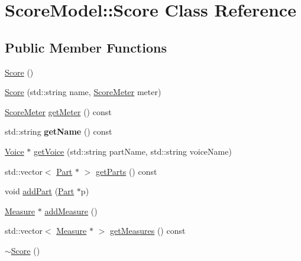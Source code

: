 \hypertarget{classScoreModel_1_1Score}{}\section{Score\+Model\+::Score Class Reference}
\label{classScoreModel_1_1Score}
\subsection*{Public Member Functions}
\begin{DoxyCompactItemize}
\item 
\mbox{\hyperlink{classScoreModel_1_1Score_acb19d6040f57ce1bf4e68dd8dab852cc}{Score}} ()
\item 
\mbox{\hyperlink{classScoreModel_1_1Score_a8721726afd70c41fdf9307a97ded2039}{Score}} (std\+::string name, \mbox{\hyperlink{classScoreModel_1_1ScoreMeter}{Score\+Meter}} meter)
\item 
\mbox{\hyperlink{classScoreModel_1_1ScoreMeter}{Score\+Meter}} \mbox{\hyperlink{classScoreModel_1_1Score_a593a14d9b5a926a4784c75c62780092b}{get\+Meter}} () const
\item 
\mbox{\label{classScoreModel_1_1Score_acb96344d926f124d945bece85de996ef}} 
std\+::string {\bfseries get\+Name} () const
\item 
\mbox{\hyperlink{classScoreModel_1_1Voice}{Voice}} $\ast$ \mbox{\hyperlink{classScoreModel_1_1Score_ac5c2af8ebfc77176d9f2c4306a4d04cb}{get\+Voice}} (std\+::string part\+Name, std\+::string voice\+Name)
\item 
std\+::vector$<$ \mbox{\hyperlink{classScoreModel_1_1Part}{Part}} $\ast$ $>$ \mbox{\hyperlink{classScoreModel_1_1Score_a1bbc42654c49e6ac2273d38cca19c5e6}{get\+Parts}} () const
\item 
void \mbox{\hyperlink{classScoreModel_1_1Score_a1e4114e834b8bea1198e36327472fd72}{add\+Part}} (\mbox{\hyperlink{classScoreModel_1_1Part}{Part}} $\ast$p)
\item 
\mbox{\hyperlink{classScoreModel_1_1Measure}{Measure}} $\ast$ \mbox{\hyperlink{classScoreModel_1_1Score_aa528b4e1ef3181f6f90c93b49fe8fafd}{add\+Measure}} ()
\item 
std\+::vector$<$ \mbox{\hyperlink{classScoreModel_1_1Measure}{Measure}} $\ast$ $>$ \mbox{\hyperlink{classScoreModel_1_1Score_ab57bcfbe1552fba4e8e7882a7db8b21b}{get\+Measures}} () const
\item 
\mbox{\hyperlink{classScoreModel_1_1Score_a0016a76d4d96c208c6dd586ab64491db}{$\sim$\+Score}} ()
\end{DoxyCompactItemize}


